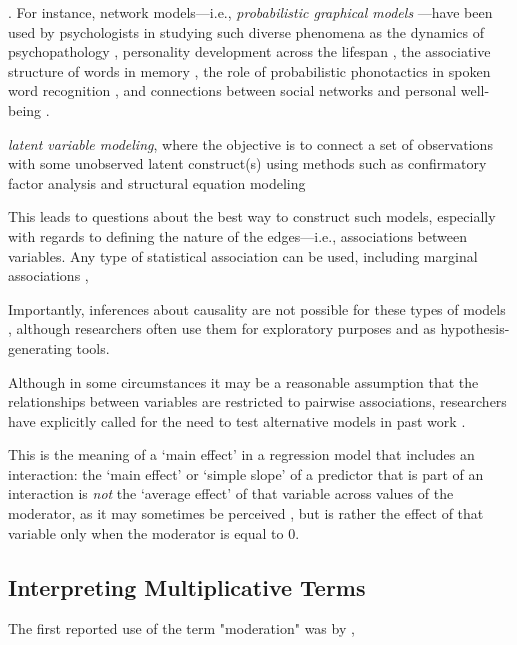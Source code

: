 \parencite[cf.][]{borgatti2009network,barabasi2016network}. For instance, network models---i.e., \textit{probabilistic graphical models} \cite{lauritzen1996graphical}---have been used by psychologists in studying such diverse phenomena as the dynamics of psychopathology \parencite[e.g.,][]{cramer2010comorbidity,epskamp2018personalized}, personality development across the lifespan \parencite[e.g.,][]{read2010neural,costantini2019stability}, the associative structure of words in memory \parencite[e.g.,][]{hills2010associative,de2008word}, the role of probabilistic phonotactics in spoken word recognition \parencite[e.g.,][]{vitevitch2016phonological}, and connections between social networks and personal well-being \parencite[e.g.,][]{kindermann1980relation,galaskiewicz1993social}.


\textit{latent variable modeling}, where the objective is to connect a set of observations with some unobserved latent construct(s) using methods such as confirmatory factor analysis and structural equation modeling \parencites(e.g.,)(){little2006merits}

This leads to questions about the best way to construct such models, especially with regards to defining the nature of the edges---i.e., associations between variables. Any type of statistical association can be used, including marginal associations \parencites(such as zero-order correlations; 
e.g.,)(){forbush2016ed,siew2019using}, 

Importantly, inferences about causality are not possible for these types of models \parencites(see)(){ryan2019dags}, although researchers often use them for exploratory purposes and as hypothesis-generating tools.

Although in some circumstances it may be a reasonable assumption that the relationships between variables are restricted to pairwise associations, researchers have explicitly called for the need to test alternative models in past work \parencites(e.g.,)(){fried2017moving}.


This is the meaning of a `main effect' in a regression model that includes an interaction: the `main effect' or `simple slope' of a predictor that is part of an interaction is \textit{not} the `average effect' of that variable across values of the moderator, as it may sometimes be perceived \parencites(cf.)(){friedrich1982defense}, but is rather the effect of that variable only when the moderator is equal to 0. 

\subsection{Interpreting Multiplicative Terms}
The first reported use of the term "moderation" was by \textcite{saunders1955moderator}, 


